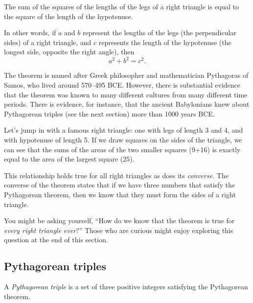 \begin{boxeddef}
The sum of the squares of the lengths of the \glspl{leg} of a right triangle is equal to the square of the length of the \gls{hypotenuse}.

In other words, if $a$ and $b$ represent the lengths of the legs (the perpendicular sides) of a right triangle, and $c$ represents the length of the hypotenuse (the longest side, opposite the right angle), then \[a^2 + b^2 = c^2.\]
\end{boxeddef}

The theorem is named after Greek philosopher and mathematician Pythagoras of Samos, who lived around 570--495 BCE. However, there is substantial evidence that the theorem was known to many different cultures from many different time periods. There is evidence, for instance, that the ancient Babylonians knew about Pythagorean triples (see the next section) more than 1000 years BCE.

Let's jump in with a famous right triangle: one with legs of length 3 and 4, and with hypotenuse of length 5. If we draw squares on the sides of the triangle, we can see that the sums of the areas of the two smaller squares (9+16) is exactly equal to the area of the largest square (25).
\begin{center}
\end{center}

This relationship holds true for all right triangles as does its \textit{converse}. The converse of the theorem states that if we have three numbers that satisfy the Pythagorean theorem, then we know that they must form the sides of a right triangle.

You might be asking yourself, ``How do we know that the theorem is true for \textit{every right triangle ever}?'' Those who are curious might enjoy exploring this question at the end of this section.

\subsection{{P}ythagorean triples}

\begin{boxeddef}
A \textit{Pythagorean triple} is a set of three positive integers satisfying the Pythagorean theorem.
\end{boxeddef}

